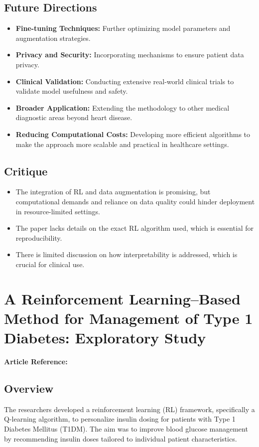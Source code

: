 \subsection*{Future Directions}
\begin{itemize}
    \item \textbf{Fine-tuning Techniques:} Further optimizing model parameters and augmentation strategies.
    \item \textbf{Privacy and Security:} Incorporating mechanisms to ensure patient data privacy.
    \item \textbf{Clinical Validation:} Conducting extensive real-world clinical trials to validate model usefulness and safety.
    \item \textbf{Broader Application:} Extending the methodology to other medical diagnostic areas beyond heart disease.
    \item \textbf{Reducing Computational Costs:} Developing more efficient algorithms to make the approach more scalable and practical in healthcare settings.
\end{itemize}

\subsection*{Critique}
\begin{itemize}
    \item The integration of RL and data augmentation is promising, but computational demands and reliance on data quality could hinder deployment in resource-limited settings.
    \item The paper lacks details on the exact RL algorithm used, which is essential for reproducibility.
    \item There is limited discussion on how interpretability is addressed, which is crucial for clinical use.
\end{itemize}


\section{A Reinforcement Learning–Based Method for Management of Type 1 Diabetes: Exploratory Study}
\textbf{Article Reference:} \cite{article_7}

\subsection*{Overview}
The researchers developed a reinforcement learning (RL) framework, specifically a Q-learning algorithm, to personalize insulin dosing for patients with Type 1 Diabetes Mellitus (T1DM). The aim was to improve blood glucose management by recommending insulin doses tailored to individual patient characteristics.

